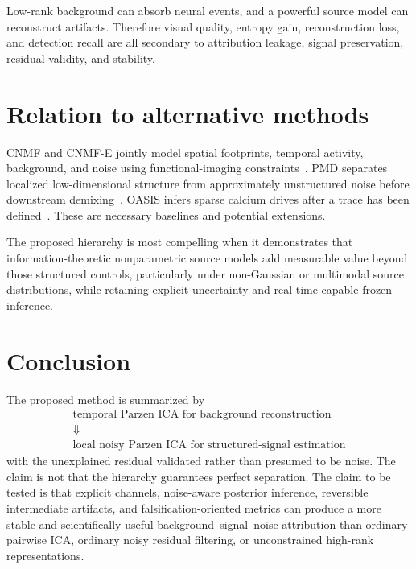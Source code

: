 \documentclass[11pt]{article}
\begin{document}
Low-rank background can absorb neural events, and a powerful source model can
reconstruct artifacts. Therefore visual quality, entropy gain, reconstruction
loss, and detection recall are all secondary to attribution leakage, signal
preservation, residual validity, and stability.

\section{Relation to alternative methods}

CNMF and CNMF-E jointly model spatial footprints, temporal activity, background,
and noise using functional-imaging constraints~\cite{pnevmatikakis2016,zhou2018}.
PMD separates localized low-dimensional structure from approximately
unstructured noise before downstream demixing~\cite{buchanan2018}. OASIS infers
sparse calcium drives after a trace has been defined~\cite{friedrich2017}. These
are necessary baselines and potential extensions.

The proposed hierarchy is most compelling when it demonstrates that
information-theoretic nonparametric source models add measurable value beyond
those structured controls, particularly under non-Gaussian or multimodal source
distributions, while retaining explicit uncertainty and real-time-capable frozen
inference.

\section{Conclusion}

The proposed method is summarized by
\begin{equation}
\boxed{
\begin{gathered}
\text{temporal Parzen ICA for background reconstruction}\\[-1mm]
\Downarrow\\[-1mm]
\text{local noisy Parzen ICA for structured-signal estimation}
\end{gathered}}
\end{equation}
with the unexplained residual validated rather than presumed to be noise. The
claim is not that the hierarchy guarantees perfect separation. The claim to be
tested is that explicit channels, noise-aware posterior inference, reversible
intermediate artifacts, and falsification-oriented metrics can produce a more
stable and scientifically useful background--signal--noise attribution than
ordinary pairwise ICA, ordinary noisy residual filtering, or unconstrained
high-rank representations.



\end{document}
